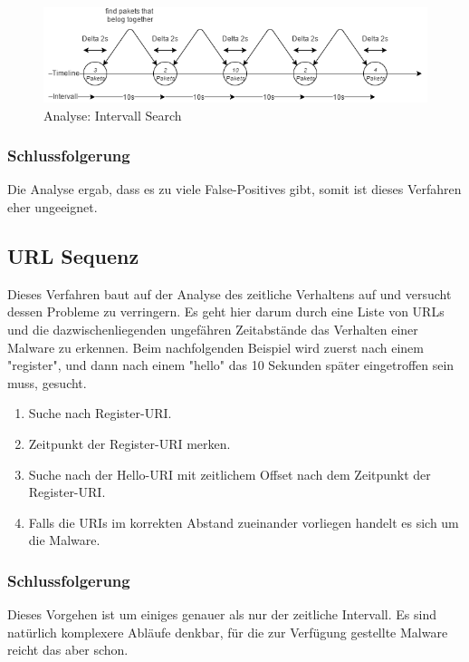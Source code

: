 \begin{figure}[H]
	\centering
	\includegraphics[width=\textwidth]{img/IntervallSearch.png}
	\caption{Analyse: Intervall Search}
	\label{fig:intervall_search}
\end{figure}


\subsubsection{Schlussfolgerung}
Die Analyse ergab, dass es zu viele False-Positives gibt, somit ist dieses Verfahren eher ungeeignet.

\subsection{URL Sequenz}
Dieses Verfahren baut auf der Analyse des zeitliche Verhaltens auf und versucht dessen Probleme zu verringern. Es geht hier darum durch eine Liste von URLs und die dazwischenliegenden ungefähren Zeitabstände das Verhalten einer Malware zu erkennen. Beim nachfolgenden Beispiel wird zuerst nach einem "register", und dann nach einem "hello" das 10 Sekunden später eingetroffen sein muss, gesucht.

\begin{enumerate}
	\item Suche nach Register-URI.
	\item Zeitpunkt der Register-URI merken.
	\item Suche nach der Hello-URI mit zeitlichem Offset nach dem Zeitpunkt der Register-URI.
	\item Falls die URIs im korrekten Abstand zueinander vorliegen handelt es sich um die Malware.
\end{enumerate}

\subsubsection{Schlussfolgerung}
Dieses Vorgehen ist um einiges genauer als nur der zeitliche Intervall. Es sind natürlich komplexere Abläufe denkbar, für die zur Verfügung gestellte Malware reicht das aber schon.

